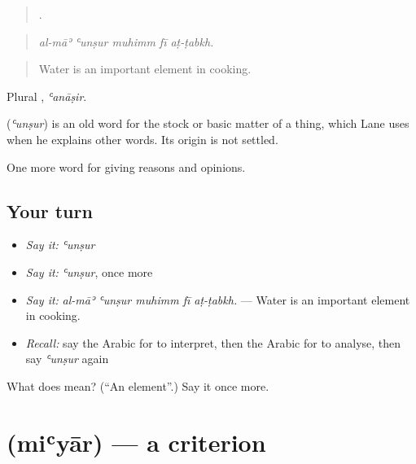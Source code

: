 \begin{quote}
    .
\end{quote}

\begin{quote}
\emph{al-māʾ ʿunṣur muhimm fī aṭ-ṭabkh.}
\end{quote}

\begin{quote}
Water is an important element in cooking.
\end{quote}

Plural , \emph{ʿanāṣir}.

\begin{cousinweb}
\textbf{} (\emph{ʿunṣur}) is an old word for the stock or basic matter of a thing, which Lane uses when he explains other words. Its origin is not settled.
\end{cousinweb}

\begin{grammarlens}[title={What you've built}]
One more word for giving reasons and opinions.
\end{grammarlens}

\subsection*{Your turn}
\begin{itemize}
\raggedright
  \item \emph{Say it:} \emph{ʿunṣur}
  \item \emph{Say it:} \emph{ʿunṣur}, once more
  \item \emph{Say it:} \emph{al-māʾ ʿunṣur muhimm fī aṭ-ṭabkh.} — Water is an important element in cooking.
  \item \emph{Recall:} say the Arabic for to interpret, then the Arabic for to analyse, then say \emph{ʿunṣur} again
\end{itemize}

\begin{tcolorbox}[breakable,colback=teal!4,colframe=teal!35!black,title={Before you move on}]
What does  mean? (\textquotedblleft{}An element\textquotedblright{}.) Say it once more.
\end{tcolorbox}
\section[\texorpdfstring{\ar{معيار} (miʿyār)}{معيار (miʿyār)}]{ (miʿyār) — a criterion}

